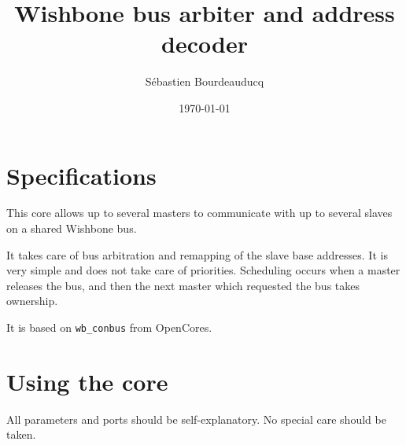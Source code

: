 \documentclass[a4paper,11pt]{article}
\title{Wishbone bus arbiter and address decoder}
\author{S\'ebastien Bourdeauducq}
\date{\today}
\begin{document}
\setlength{\parindent}{0pt}
\setlength{\parskip}{5pt}
\maketitle{}
\section{Specifications}
This core allows up to several masters to communicate with up to several slaves on a shared Wishbone bus.

It takes care of bus arbitration and remapping of the slave base addresses. It is very simple and does not take care of priorities. Scheduling occurs when a master releases the bus, and then the next master which requested the bus takes ownership.

It is based on \verb!wb_conbus! from OpenCores.

\section{Using the core}
All parameters and ports should be self-explanatory. No special care should be taken.
\end{document}
